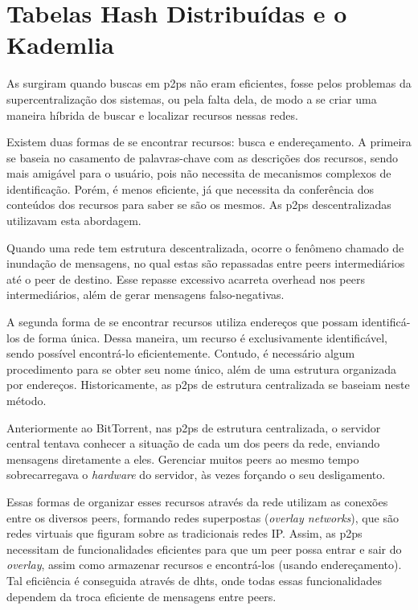 
\newpage
\section{Tabelas Hash Distribuídas e o Kademlia}

As  surgiram quando buscas em \glspl{p2p} não eram eficientes, fosse
pelos problemas da supercentralização dos sistemas, ou pela falta dela, de modo a se
criar uma maneira híbrida de buscar e localizar recursos nessas redes.

Existem duas formas de se encontrar recursos: busca e endereçamento. A primeira se
baseia no casamento de palavras-chave com as descrições dos recursos, sendo mais
amigável para o usuário, pois não necessita de mecanismos complexos de identificação.
Porém, é menos eficiente, já que necessita da conferência dos conteúdos dos recursos
para saber se são os mesmos. As \glspl*{p2p} descentralizadas utilizavam esta abordagem.

Quando uma rede tem estrutura descentralizada, ocorre o fenômeno chamado de inundação
de mensagens, no qual estas são repassadas entre \glspl*{peer} intermediários até o
\gls*{peer} de destino. Esse repasse excessivo acarreta \gls{overhead} nos \glspl*{peer}
intermediários, além de gerar mensagens falso-negativas.

A segunda forma de se encontrar recursos utiliza endereços que possam identificá-los de
forma única. Dessa maneira, um recurso é exclusivamente identificável, sendo possível
encontrá-lo eficientemente. Contudo, é necessário algum procedimento para se obter seu
nome único, além de uma estrutura organizada por endereços. Historicamente, as
\glspl*{p2p} de estrutura centralizada se baseiam neste método.

Anteriormente ao BitTorrent, nas \glspl*{p2p} de estrutura centralizada, o servidor
central tentava conhecer a situação de cada um dos \glspl*{peer} da rede, enviando
mensagens diretamente a eles. Gerenciar muitos \glspl*{peer} ao mesmo tempo
sobrecarregava o \emph{hardware} do servidor, às vezes forçando o seu desligamento.

Essas formas de organizar esses recursos através da rede utilizam as conexões entre os
diversos \glspl*{peer}, formando redes superpostas (\emph{overlay networks}), que são
redes virtuais que figuram sobre as tradicionais redes IP. Assim, as \glspl*{p2p}
necessitam de funcionalidades eficientes para que um \gls*{peer} possa entrar e sair do
\emph{overlay}, assim como armazenar recursos e encontrá-los (usando endereçamento). Tal
eficiência é conseguida através de \glspl{dht}, onde todas essas funcionalidades
dependem da troca eficiente de mensagens entre \glspl*{peer}.

